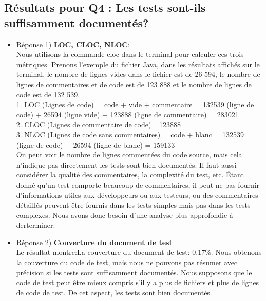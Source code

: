 \documentclass{proc}
\begin{document}
\subsection{Résultats pour Q4 : Les tests sont-ils suffisamment documentés?}
\begin{itemize}
    \item Réponse 1) \textbf{LOC, CLOC, NLOC}: 
    \\ Nous utilisons la commande cloc dans le terminal pour calculer ces trois métriques. Prenons l'exemple du fichier Java, dans les résultats affichés sur le terminal, le nombre de lignes vides dans le fichier est de 26 594, le nombre de lignes de commentaires et de code est de 123 888 et le nombre de lignes de code est de 132 539.
    \\1. LOC (Lignes de code) = code + vide + commentaire = 132539 (ligne de code) + 26594 (ligne vide) + 123888 (ligne de commentaire) = 283021
    \\2. CLOC (Lignes de commentaire de code)= 123888
    \\3. NLOC (Lignes de code sans commentaires) = code + blanc = 132539 (ligne de code) + 26594 (ligne de blanc) = 159133
    \\On peut voir le nombre de lignes commentées du code source, mais cela n'indique pas directement les tests sont bien documentés. Il faut aussi considérer la qualité des commentaires, la complexité du test, etc. Étant donné qu'un test comporte beaucoup de commentaires, il peut ne pas fournir d'informations utiles aux développeurs ou aux testeurs, ou des commentaires détaillés peuvent être fournis dans les tests simples mais pas dans les tests complexes. Nous avons donc besoin d'une analyse plus approfondie à derterminer.
    \item Réponse 2) \textbf{Couverture du document de test}
    \\Le résultat montre:La couverture du document de test: 0.17\%.
    Nous obtenons la couverture du code de test, mais nous ne pouvons pas résumer avec précision si les tests sont suffisamment documentés. Nous supposons que le code de test peut être mieux compris s'il y a plus de fichiers et plus de lignes de code de test. De cet aspect, les tests sont bien documentés.
\end{itemize}
\end{document}
